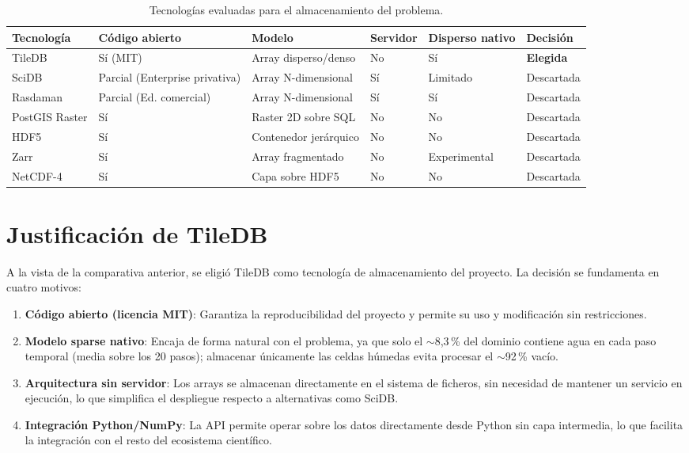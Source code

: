 \begin{table}[ht]
\centering
\small
\begin{tabularx}{\textwidth}{>{\raggedright\arraybackslash}p{2.0cm}>{\raggedright\arraybackslash}p{2.4cm}L>{\raggedright\arraybackslash}p{1.5cm}>{\raggedright\arraybackslash}p{2.2cm}>{\raggedright\arraybackslash}p{1.5cm}}
\toprule
\textbf{Tecnología} & \textbf{Código abierto} & \textbf{Modelo} & \textbf{Servidor} & \textbf{Disperso nativo} & \textbf{Decisión} \\
\midrule
TileDB & Sí (MIT) & Array disperso/denso & No & Sí & \textbf{Elegida} \\
SciDB & Parcial (Enterprise privativa) & Array N-dimensional & Sí & Limitado & Descartada \\
Rasdaman & Parcial (Ed. comercial) & Array N-dimensional & Sí & Sí & Descartada \\
PostGIS Raster & Sí & Raster 2D sobre SQL & No & No & Descartada \\
HDF5 & Sí & Contenedor jerárquico & No & No & Descartada \\
Zarr & Sí & Array fragmentado & No & Experimental & Descartada \\
NetCDF-4 & Sí & Capa sobre HDF5 & No & No & Descartada \\
\bottomrule
\end{tabularx}
\caption{Tecnologías evaluadas para el almacenamiento del problema.}
\label{tab:tecnologias}
\end{table}

\section{Justificación de TileDB}\label{justificacion-de-tiledb}

A la vista de la comparativa anterior, se eligió TileDB como tecnología de almacenamiento del proyecto. La decisión se fundamenta en cuatro motivos:

\begin{enumerate}
\item \textbf{Código abierto (licencia MIT)}: Garantiza la reproducibilidad del proyecto y permite su uso y modificación sin restricciones.
\item \textbf{Modelo sparse nativo}: Encaja de forma natural con el problema, ya que solo el $\sim$8,3\,\% del dominio contiene agua en cada paso temporal (media sobre los 20 pasos); almacenar únicamente las celdas húmedas evita procesar el $\sim$92\,\% vacío.
\item \textbf{Arquitectura sin servidor}: Los arrays se almacenan directamente en el sistema de ficheros, sin necesidad de mantener un servicio en ejecución, lo que simplifica el despliegue respecto a alternativas como SciDB.
\item \textbf{Integración Python/NumPy}: La API permite operar sobre los datos directamente desde Python sin capa intermedia, lo que facilita la integración con el resto del ecosistema científico.
\end{enumerate}

